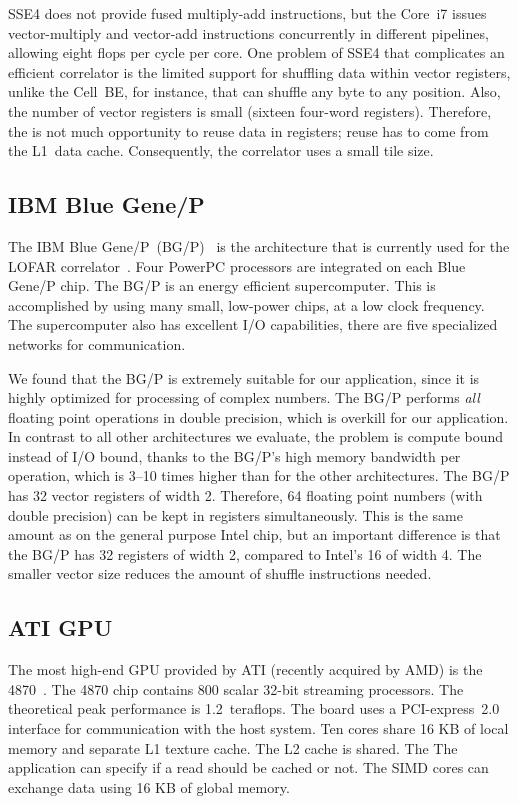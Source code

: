 \documentclass{article}
\begin{document}
SSE4 does not provide fused multiply-add instructions, but the Core~i7 issues
vector-multiply and vector-add instructions concurrently in different pipelines,
allowing eight flops per cycle per core.
One problem of SSE4 that complicates an efficient correlator is the limited
support for shuffling data within vector registers, unlike the Cell~BE, for
instance, that can shuffle any byte to any position.
Also, the number of vector registers is small (sixteen four-word registers).
Therefore, the is not much opportunity to reuse data in registers; reuse
has to come from the L1~data cache.
Consequently, the correlator uses a small tile size.


\subsection{IBM Blue Gene/P}

The IBM Blue Gene/P~(BG/P)~\cite{IBM:08} is the architecture that is
currently used for the LOFAR correlator~\cite{Romein:06,Romein:09b}.
Four PowerPC processors are integrated on each Blue Gene/P chip.
The BG/P is an energy efficient supercomputer.
This is accomplished by using many small, low-power chips, at a low clock
frequency.
The supercomputer also has excellent I/O capabilities, there are five
specialized networks for communication.

We found that the BG/P is extremely suitable for our application,
since it is highly optimized for processing of complex numbers.
The BG/P performs \emph{all} floating point operations in double
precision, which is overkill for our application.
In contrast to all other architectures we evaluate, the problem is compute
bound instead of I/O bound, thanks to the BG/P's high memory bandwidth per
operation, which is 3--10 times higher than for the other architectures.
The BG/P has 32 vector registers of width 2.  Therefore, 64 floating
point numbers (with double precision) can be kept in registers
simultaneously. This is the same amount as on the general purpose
Intel chip, but an important difference is that the BG/P has 32
registers of width 2, compared to Intel's 16 of width 4.  The smaller
vector size reduces the amount of shuffle instructions needed.


\subsection{ATI GPU}

The most high-end GPU provided by ATI (recently acquired by AMD) is
the 4870~\cite{amd-manual}.  The 4870 chip contains 800 scalar 32-bit
streaming processors.  The theoretical peak performance is
1.2~teraflops. The board uses a PCI-express~2.0 interface
for communication with the host system.  Ten cores
share 16 KB of local memory and separate L1 texture cache.  The L2
cache is shared. The The application can specify if a read should be
cached or not.  The SIMD cores can exchange data using 16 KB of global
memory.
\end{document}
